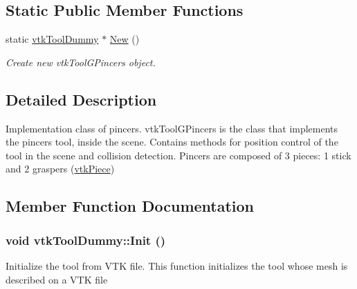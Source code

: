 \subsection*{Static Public Member Functions}
\begin{DoxyCompactItemize}
\item 
\hypertarget{classvtkToolDummy_a3fc4028c21d848a4eb9db02555689c1a}{
static \hyperlink{classvtkToolDummy}{vtkToolDummy} $\ast$ \hyperlink{classvtkToolDummy_a3fc4028c21d848a4eb9db02555689c1a}{New} ()}
\label{classvtkToolDummy_a3fc4028c21d848a4eb9db02555689c1a}

\begin{DoxyCompactList}\small\item\em Create new vtkToolGPincers object. \item\end{DoxyCompactList}\end{DoxyCompactItemize}


\subsection{Detailed Description}
Implementation class of pincers. vtkToolGPincers is the class that implements the pincers tool, inside the scene. Contains methods for position control of the tool in the scene and collision detection. Pincers are composed of 3 pieces: 1 stick and 2 graspers (\hyperlink{classvtkPiece}{vtkPiece}) 

\subsection{Member Function Documentation}
\hypertarget{classvtkToolDummy_aaf4c69a9c0fc3432e678ca9fffc913dc}{
\subsubsection[{Init}]{\setlength{\rightskip}{0pt plus 5cm}void vtkToolDummy::Init ()}}
\label{classvtkToolDummy_aaf4c69a9c0fc3432e678ca9fffc913dc}


Initialize the tool from VTK file. This function initializes the tool whose mesh is described on a VTK file 

